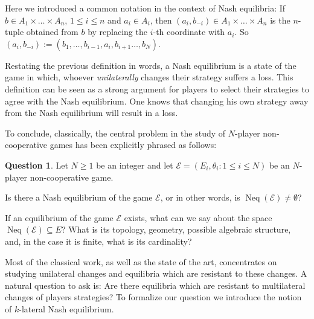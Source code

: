 \documentclass[a4paper,11pt,reqno,english]{amsart}
\theoremstyle{plain}
\theoremstyle{definition}
\newtheorem{question}[theorem]{Question}
\newcommand{\Ecal}{\mathcal{E}}
\DeclareMathOperator{\NashEquilibria}{Neq}
\begin{document}
 
\medskip
Here we introduced a common notation in the context of Nash equilibria: If $b\in A_1\times\dots\times A_n$, $1\leq i\leq n$ and $a_i\in A_i$, then $(a_i, b_{-i}) \in A_1\times\dots\times A_n$ is the $n$-tuple obtained from $b$ by replacing the $i$-th coordinate with $a_i$. So $(a_i, b_{-i}) := (b_1,\dots,b_{i-1},a_i,b_{i+1}\dots,b_N)$.

\medskip
Restating the previous definition in words, a Nash equilibrium is a state of the game in which, whoever \textit{unilaterally} changes their strategy suffers a loss.
This definition can be seen as a strong argument for players to select their strategies to agree with the Nash equilibrium.
One knows that changing his own strategy away from the Nash equilibrium will result in a loss.

\medskip
To conclude, classically, the central problem in the study of $N$-player non-cooperative games has been explicitly phrased as follows:

\begin{question}
	Let $N\geq 1$ be an integer and let $\Ecal=(E_i,\theta_i : 1\leq i\leq N)$ be an $N$-player non-cooperative game.
	\begin{compactenum}[\rm \quad (A)]
		\item Is there a Nash equilibrium of the game $\Ecal$, or in other words, is $\NashEquilibria (\Ecal)\neq\emptyset$?
		\item If an equilibrium of the game $\Ecal$ exists, what can we say about the space $\NashEquilibria (\Ecal)\subseteq E$? 
			What is its topology, geometry, possible algebraic structure, and, in the case it is finite, what is its cardinality?
	\end{compactenum}
\end{question}

\medskip
Most of the classical work, as well as the state of the art, concentrates on studying unilateral changes and equilibria which are resistant to these changes.
A natural question to ask is:  Are there equilibria which are resistant to multilateral changes of players strategies?
To formalize our question we introduce the notion of $k$-lateral Nash equilibrium.
\end{document}
